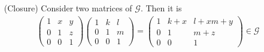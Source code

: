 \documentclass[solution]{tudexercise}
\begin{document}
			\subsubsection{}
				\begin{itemize}
				\item[(Closure)]
					Consider two matrices of $\mathcal{G}$. Then it is
					\begin{align*}
\begin{pmatrix}
1 & x & y\\
0 & 1 & z\\
0 & 0 & 1
\end{pmatrix}\begin{pmatrix}
1 & k & l\\
0 & 1 & m\\
0 & 0 & 1
\end{pmatrix} = \begin{pmatrix}
1 & k + x & l + xm + y\\
0 & 1 & m + z\\
0 & 0 & 1
\end{pmatrix} \in \mathcal{G}
					\end{align*}
				

\end{itemize}
\end{document}
